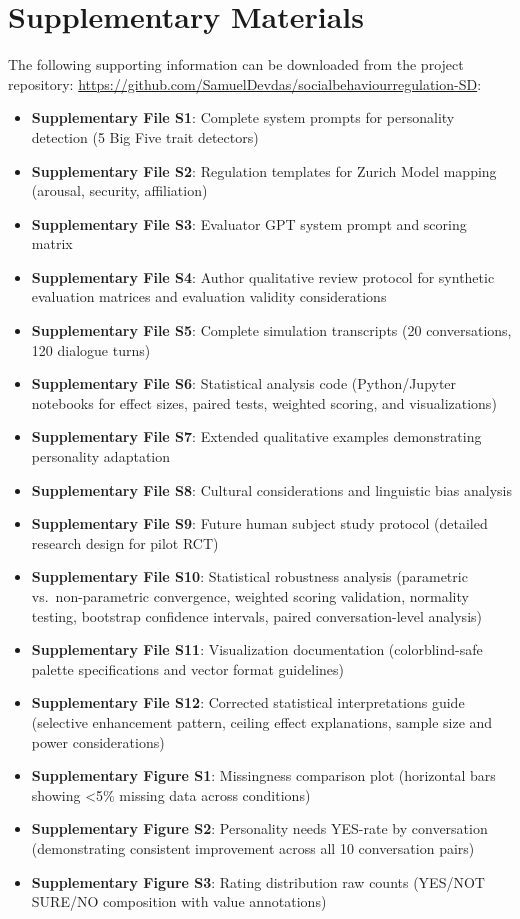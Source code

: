 \section{Supplementary Materials}\label{supplementary-materials}

The following supporting information can be downloaded from the project repository: \url{https://github.com/SamuelDevdas/socialbehaviourregulation-SD}:

\begin{itemize}
\tightlist
\item
  \textbf{Supplementary File S1}: Complete system prompts for personality detection (5 Big Five trait detectors)
\item
  \textbf{Supplementary File S2}: Regulation templates for Zurich Model mapping (arousal, security, affiliation)
\item
  \textbf{Supplementary File S3}: Evaluator GPT system prompt and scoring matrix
\item
  \textbf{Supplementary File S4}: Author qualitative review protocol for synthetic evaluation matrices and evaluation validity considerations
\item
  \textbf{Supplementary File S5}: Complete simulation transcripts (20 conversations, 120 dialogue turns)
\item
  \textbf{Supplementary File S6}: Statistical analysis code (Python/Jupyter notebooks for effect sizes, paired tests, weighted scoring, and visualizations)
\item
  \textbf{Supplementary File S7}: Extended qualitative examples demonstrating personality adaptation
\item
  \textbf{Supplementary File S8}: Cultural considerations and linguistic bias analysis
\item
  \textbf{Supplementary File S9}: Future human subject study protocol (detailed research design for pilot RCT)
\item
  \textbf{Supplementary File S10}: Statistical robustness analysis (parametric vs.~non-parametric convergence, weighted scoring validation, normality testing, bootstrap confidence intervals, paired conversation-level analysis)
\item
  \textbf{Supplementary File S11}: Visualization documentation (colorblind-safe palette specifications and vector format guidelines)
\item
  \textbf{Supplementary File S12}: Corrected statistical interpretations guide (selective enhancement pattern, ceiling effect explanations, sample size and power considerations)
\item
  \textbf{Supplementary Figure S1}: Missingness comparison plot (horizontal bars showing \textless5\% missing data across conditions)
\item
  \textbf{Supplementary Figure S2}: Personality needs YES-rate by conversation (demonstrating consistent improvement across all 10 conversation pairs)
\item
  \textbf{Supplementary Figure S3}: Rating distribution raw counts (YES/NOT SURE/NO composition with value annotations)
\end{itemize}

